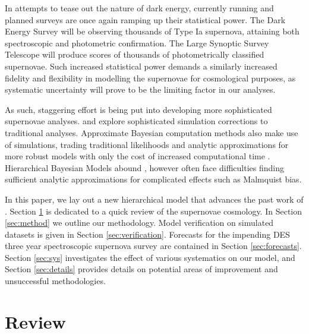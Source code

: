 \documentclass[a4paper,fleqn,usenatbib]{mnras}
\newcommand{\red}{\color{red}}
\begin{document}
In attempts to tease out the nature of dark energy, currently running and planned surveys are once again ramping up their statistical power. The Dark Energy Survey \citep[DES,][]{Bernstein2012, Abbott2016} will be observing thousands of Type Ia supernova, attaining both spectroscopic and photometric confirmation. The Large Synoptic Survey Telescope \citep[LSST,][]{Ivezic2008, LSSTScienceCollaboration2009} will produce scores of thousands of photometrically classified supernovae. Such increased statistical power demands a similarly increased fidelity and flexibility in modelling the supernovae for cosmological purposes, as systematic uncertainty will prove to be the limiting factor in our analyses.

As such, staggering effort is being put into developing more sophisticated supernovae analyses. \citet{Scolnic2016} and \citet{Kessler2017} explore sophisticated simulation corrections to traditional analyses. Approximate Bayesian computation methods also make use of simulations, trading traditional likelihoods and analytic approximations for more robust models with only the cost of increased computational time \citep{Weyant2013, Jennings2016}. Hierarchical Bayesian Models abound \citep{Mandel2009, March2011, March2014, Rubin2015, Shariff2016, Roberts2017}, however often face difficulties finding sufficient analytic approximations for complicated effects such as Malmquist bias.


In this paper, we lay out a new hierarchical model that advances the past work of \citet{Rubin2015}. Section \ref{sec:review} is dedicated to a quick review of the supernovae cosmology. In Section \ref{sec:method} we outline our methodology. Model verification on simulated datasets is given in Section \ref{sec:verification}. Forecasts for the impending DES three year spectroscopic supernova survey are contained in Section \ref{sec:forecasts}. {\red Section \ref{sec:sys} investigates the effect of various systematics on our model, and Section \ref{sec:details} provides details on potential areas of improvement and unsuccessful methodologies. }









\section{Review}
\label{sec:review}
\end{document}
